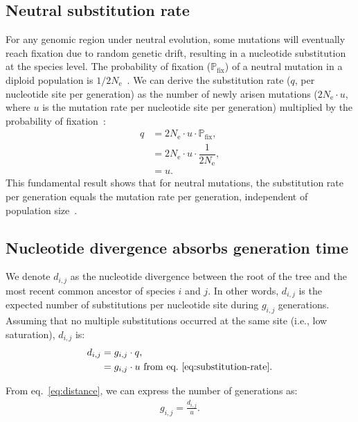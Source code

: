 \documentclass{article}
\newcommand{\Multiply}{\cdot}
\newcommand{\Ne}{N_{\text{e}}}
\newcommand{\MutationRateNuc}{u}
\newcommand{\proba}{\mathbb{P}}
\newcommand{\pfix}{\proba_{\text{fix}}}
\newcommand{\Spi}{i}
\newcommand{\Spj}{j}
\newcommand{\NbrGen}{g_{\Spi, \Spj}}
\newcommand{\NucDiv}{d_{\Spi, \Spj}}
\newcommand{\SubRate}{q}
\begin{document}
\subsection{Neutral substitution rate}

For any genomic region under neutral evolution, some mutations will eventually reach fixation due to random genetic drift, resulting in a nucleotide substitution at the species level.
The probability of fixation ($\pfix$) of a neutral mutation in a diploid population is $1/2\Ne$~\citep{kimura_probability_1962}.
We can derive the substitution rate ($\SubRate$, per nucleotide site per generation) as the number of newly arisen mutations ($2\Ne \Multiply \MutationRateNuc$, where $\MutationRateNuc$ is the mutation rate per nucleotide site per generation) multiplied by the probability of fixation~\citep{kimura_evolutionary_1968}:
\begin{align}
    \SubRate & = 2 \Ne \Multiply \MutationRateNuc \Multiply \pfix, \\
    & = 2 \Ne \Multiply \MutationRateNuc \Multiply \dfrac{1}{2\Ne}, \\
    & = \MutationRateNuc. \label{eq:substitution-rate}
\end{align}
This fundamental result shows that for neutral mutations, the substitution rate per generation equals the mutation rate per generation, independent of population size~\citep{kimura_evolutionary_1968, mccandlish_modeling_2014}.

\subsection{Nucleotide divergence absorbs generation time}

We denote $\NucDiv$ as the nucleotide divergence between the root of the tree and the most recent common ancestor of species $\Spi$ and $\Spj$.
In other words, $\NucDiv$ is the expected number of substitutions per nucleotide site during $\NbrGen$ generations.
Assuming that no multiple substitutions occurred at the same site (i.e., low saturation), $\NucDiv$ is:
\begin{align}
    \NucDiv & = \NbrGen \Multiply \SubRate, \\
    & = \NbrGen \Multiply \MutationRateNuc \text{ from eq.~\ref{eq:substitution-rate}}. \label{eq:distance}
\end{align}

From eq.~\ref{eq:distance}, we can express the number of generations as:
\begin{align}
    \NbrGen = \frac{\NucDiv}{\MutationRateNuc}. \label{eq:gen-from-div}
\end{align}
\end{document}
